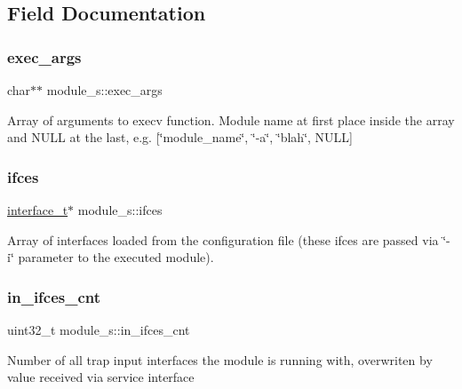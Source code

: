 \subsection{Field Documentation}
\mbox{\label{structmodule__s_afdb5c15857dfc3c323b0e0a0da3a2804}} 
\subsubsection{\texorpdfstring{exec\+\_\+args}{exec\_args}}
{\footnotesize\ttfamily char$\ast$$\ast$ module\+\_\+s\+::exec\+\_\+args}

Array of arguments to execv function. Module name at first place inside the array and N\+U\+LL at the last, e.\+g. \mbox{[}\char`\"{}module\+\_\+name\char`\"{}, \char`\"{}-\/a\char`\"{}, \char`\"{}blah\char`\"{}, N\+U\+LL\mbox{]} \mbox{\label{structmodule__s_a1d4a2637c595e49efd1670ca20d9b98d}} 
\subsubsection{\texorpdfstring{ifces}{ifces}}
{\footnotesize\ttfamily \hyperlink{structinterface__s}{interface\+\_\+t}$\ast$ module\+\_\+s\+::ifces}

Array of interfaces loaded from the configuration file (these ifces are passed via \char`\"{}-\/i\char`\"{} parameter to the executed module). \mbox{\label{structmodule__s_a11996e033ac044b49c3c84f5fa08e3ca}} 
\subsubsection{\texorpdfstring{in\+\_\+ifces\+\_\+cnt}{in\_ifces\_cnt}}
{\footnotesize\ttfamily uint32\+\_\+t module\+\_\+s\+::in\+\_\+ifces\+\_\+cnt}

Number of all trap input interfaces the module is running with, overwriten by value received via service interface \mbox{\label{structmodule__s_ab7b316923905c3beaae1a0c82665d00a}} 
